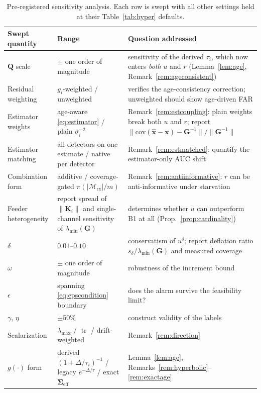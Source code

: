 \documentclass[journal]{IEEEtran}
\theoremstyle{plain}
\theoremstyle{definition}
\theoremstyle{remark}
\newcommand{\bx}{\mathbf{x}}
\newcommand{\bxh}{\hat{\mathbf{x}}}
\newcommand{\bG}{\mathbf{G}}
\newcommand{\Mrx}{\mathcal{M}_{\mathrm{rx}}}
\newcommand{\lmax}{\lambda_{\max}}
\newcommand{\lmin}{\lambda_{\min}}
\newcommand{\bSigma}{\boldsymbol{\Sigma}}
\newcommand{\bQ}{\mathbf{Q}}
\begin{document}
\begin{table}[!t]
\caption{Pre-registered sensitivity analysis. Each row is swept with all
other settings held at their Table~\ref{tab:hyper} defaults.}
\label{tab:sensitivity}
\centering
\footnotesize
\renewcommand{\arraystretch}{1.2}
\begin{tabular}{@{}l p{2.5cm} p{2.4cm}@{}}
\toprule
Swept quantity & Range & Question addressed \\
\midrule
$\bQ$ scale & $\pm$ one order of magnitude & sensitivity of the derived
$\tau_i$, which now enters \emph{both} $u$ and $r$
(Lemma~\ref{lem:age}, Remark~\ref{rem:ageconsistent}) \\
Residual weighting & $g_i$-weighted / unweighted & verifies the
age-consistency correction; unweighted should show age-driven FAR \\
Estimator weights & age-aware \eqref{eq:estimator} / plain $\sigma_i^{-2}$
& Remark~\ref{rem:estcoupling}: plain weights break both $u$ and $r$;
report $\|\mathrm{cov}(\bxh-\bx)-\bG^{-1}\|/\|\bG^{-1}\|$ \\
Estimator matching & all detectors on one estimate / native per detector &
Remark~\ref{rem:estmatched}: quantify the estimator-only AUC shift \\
Combination form & additive / coverage-gated $\pi(|\Mrx|/m)$ &
Remark~\ref{rem:antiinformative}: $r$ can be anti-informative under
starvation \\
Feeder heterogeneity & report spread of $\|\mathbf{K}_i\|$ and
single-channel sensitivity of $\lmin(\bG)$ & determines whether $u$ can
outperform B1 at all (Prop.~\ref{prop:cardinality}) \\
$\delta$ & $0.01$--$0.10$ & conservatism of $u^{\delta}$; report deflation
ratio $s_\delta/\lmin(\bG)$ and measured coverage \\
$\omega$ & $\pm$ one order of magnitude & robustness of the increment bound \\
$\epsilon$ & spanning \eqref{eq:epscondition} boundary & does the alarm
survive the feasibility limit? \\
$\gamma$, $\eta$ & $\pm50\%$ & construct validity of the labels \\
Scalarization & $\lmax$ / $\operatorname{tr}$ / drift-weighted & Remark~\ref{rem:direction} \\
$g(\cdot)$ form & derived $(1{+}\Delta/\tau_i)^{-1}$ / legacy
$e^{-\Delta/\tau}$ / exact $\bSigma_{\mathrm{eff}}$ &
Lemma~\ref{lem:age}, Remarks~\ref{rem:hyperbolic}--\ref{rem:exactage} \\

\end{tabular}
\end{table}
\end{document}
